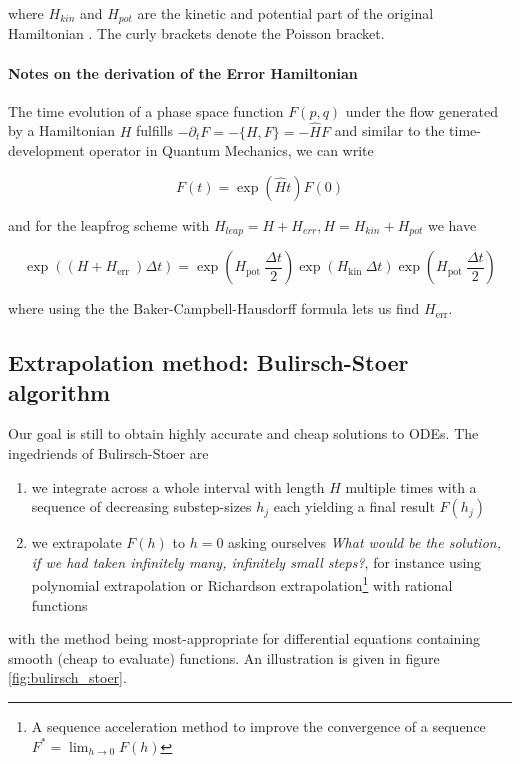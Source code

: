 where $H_{kin}$ and $H_{pot}$ are the kinetic and potential part of the original Hamiltonian \citep[chapter 2.8]{springel23}. The curly brackets denote the Poisson bracket.

\paragraph{Notes on the derivation of the Error Hamiltonian} The time evolution of a phase space
function $F(p,q)$ under the flow generated by a Hamiltonian $H$ fulfills $-\partial_t F = -\{ H, F \} = - \hat{H} F$
and similar to the time-development operator in Quantum Mechanics, we can write

\begin{equation}
  F(t) = \exp{\left( \hat{H}t \right)} F(0)
\end{equation}

and for the leapfrog scheme with $H_{leap} = H + H_{err}, H = H_{kin} + H_{pot}$ we have

\begin{equation}
  \exp \left(\left(H+H_{\text {err }}\right) \Delta t\right)=\exp \left(H_{\text {pot }} \frac{\Delta t}{2}\right) \exp \left(H_{\text {kin }} \Delta t\right) \exp \left(H_{\text {pot }} \frac{\Delta t}{2}\right)
\end{equation}

where using the the Baker-Campbell-Hausdorff formula lets us find $H_{\text {err}}$.

\subsection{Extrapolation method: Bulirsch-Stoer algorithm}
Our goal is still to obtain highly accurate and cheap solutions
to ODEs. The ingedriends of Bulirsch-Stoer are
\begin{enumerate}
  \item we integrate across a whole interval with length $H$ multiple times with a sequence of decreasing substep-sizes $h_j$ each yielding a final result $F(h_j)$
  \item we extrapolate $F(h)$ to $h = 0$ asking ourselves \textit{What would be the solution, if we had taken infinitely many, infinitely small steps?}, for instance using polynomial extrapolation or Richardson extrapolation\footnote{A sequence acceleration method to improve the convergence of a sequence $F^* = \lim_{h\rightarrow 0} F(h)$} with rational functions
\end{enumerate}
with the method being most-appropriate for differential equations containing smooth (cheap to evaluate) functions. An illustration is given in figure \ref{fig:bulirsch_stoer}.

